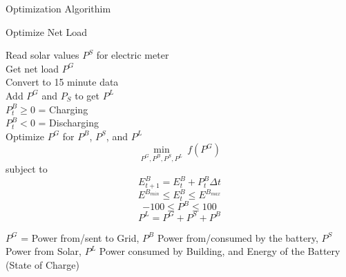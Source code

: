 \documentclass[final, 20 pt]{beamer}
\newlength{\onecolwid}
\newlength{\twocolwid}
\begin{document}
\begin{frame}[t]
\begin{columns}[t]
\begin{column}{\twocolwid}

\begin{columns}[t,totalwidth=\twocolwid] %

\begin{column}{\onecolwid} %


\begin{block}{Optimization Algorithim}
\begin{algorithm}[H]
	\caption{Optimize Net Load}\label{alg:opt}
	Read solar values $P^{S}$ for electric meter\\
	Get net load $P^{G}$ \\
	Convert to 15 minute data \\ 
	Add $P^{G}$ and $P_{S}$  to get $P^{L}$\\
	$P^{B}_{t} \geq 0$ = Charging \\
	$P^{B}_{t} < 0$ = Discharging \\
	Optimize $P^{G}$ for $P^{B}$, $P^{S}$, and  $P^{L}$\\
	\begin{equation} \label{objective_2} 
	\min_{P^{G}, P^{B}, P^{S}, P^{L}} \ f(P^{G})
	\end{equation}
	\normalsize
	subject to
	\begin{equation} \label{processing_power}
	E^{B}_{t + 1} = E^{B}_{t} + P^{B}_{t} \Delta t
	\end{equation}
	\begin{equation} \label{server_capacity}
	E^{B_{min}} \leq  E^{B}_{t} \leq E^{B_{max}}
	\end{equation}
	\begin{equation} \label{server_size}
	-100 \leq P^{B} \leq 100
	\end{equation}
	\begin{equation} \label{flow_size}
	P^{L} = P^{G} + P^{S} + P^{B}
	\end{equation}
\end{algorithm}
$P^{G}$ = Power from/sent to Grid, $P^{B}$ Power from/consumed by the battery, $P^{S}$ Power from Solar, $P^{L}$ Power consumed by Building, and Energy of the Battery (State of Charge)


\end{block}
\end{column}
\end{columns}
\end{column}
\end{columns}
\end{frame}
\end{document}
